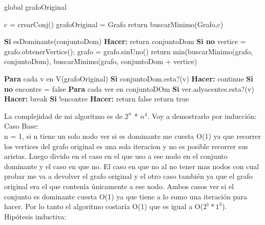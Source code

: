 global grafoOriginal

\begin{codebox}
\li	c = crearConj()
\li	grafoOriginal = Grafo
\li	return buscarMinimo(Grafo,c)
\end{codebox}

\begin{codebox}
\li\textbf{Si} esDominante(conjuntoDom) \textbf{Hacer:} \Do
\li		return conjuntoDom 
\End
\li	\textbf{Si no}  \Do
\li		vertice = grafo.obtenerVertice(); 
\li		grafo = grafo.sinUno()
\li		return min(buscarMinimo(grafo, conjuntoDom), buscarMinimo(grafo, conjuntoDom + vertice)	
\End

\end{codebox}

\begin{codebox}
\li \textbf{Para} cada v en V(grafoOriginal) \Do
\li \textbf{Si} conjuntoDom.esta?(v) \textbf{Hacer:} \Do
\li			continue 
		\End
\li \textbf{Si no}  \Do
\li			encontre = false
\li \textbf{Para} cada ver en conjuntoDOm \Do
\li	\textbf{Si} ver.adyacentes.esta?(v) \textbf{Hacer:} \Do	
\li			break
			\End
\li	\textbf{Si} !encontre \textbf{Hacer:} \Do				
\li		return false
			\End
		\End
	\End
\End
	return true
\end{codebox}

La complejidad de mi algoritmo es de $2^n$ * $n^3$. Voy a demostrarlo por inducción:\\

Caso Base:\\

n = 1, si n tiene un solo nodo ver si es dominante me cuesta O(1) ya que recorrer los vertices del grafo original es una sola iteracion y no es posible recorrer sus aristas. Luego divido en el caso en el que uso a ese nodo en el conjunto dominante y el caso en que no. El caso en que no al no tener mas nodos con cual probar me va a devolver el grafo original y el otro caso también ya que el grafo original era el que contenía únicamente a ese nodo. Ambos casos ver si el conjunto es dominante cuesta O(1) ya que tiene a lo sumo una iteración para hacer. Por lo tanto el algoritmo costaría O(1) que es igual a O($2^1*1^3$).\\

Hipótesis inductiva:\\

